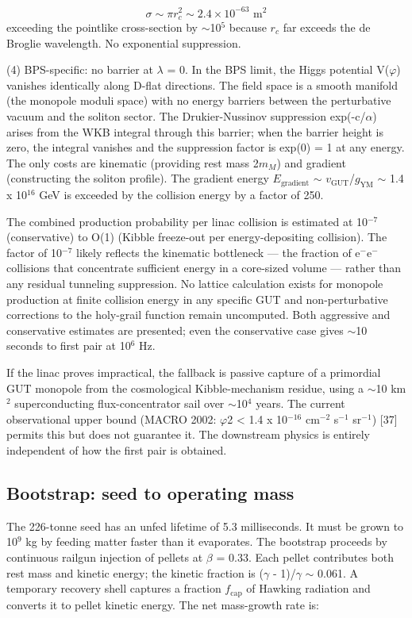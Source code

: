 \documentclass[12pt,a4paper]{article}
\begin{document}
\begin{equation}
\sigma \sim \pi r_c^2 \sim 2.4 \times 10^{-63} \text{ m}^2
\end{equation}
exceeding the pointlike cross-section by $\sim$10$^{5}$ because $r_c$ far exceeds the de Broglie wavelength. No exponential suppression.

(4) BPS-specific: no barrier at $\lambda$ = 0. In the BPS limit, the Higgs potential V($\varphi$) vanishes identically along D-flat directions. The field space is a smooth manifold (the monopole moduli space) with no energy barriers between the perturbative vacuum and the soliton sector. The Drukier-Nussinov suppression exp(-c/$\alpha$) arises from the WKB integral through this barrier; when the barrier height is zero, the integral vanishes and the suppression factor is exp(0) = 1 at any energy. The only costs are kinematic (providing rest mass 2$m_M$) and gradient (constructing the soliton profile). The gradient energy $E_{\text{gradient}}$ $\sim$ $v_{\text{GUT}}$/$g_{\text{YM}}$ $\sim$ 1.4 x 10$^{16}$ GeV is exceeded by the collision energy by a factor of 250.

The combined production probability per linac collision is estimated at 10$^{-7}$ (conservative) to O(1) (Kibble freeze-out per energy-depositing collision). The factor of 10$^{-7}$ likely reflects the kinematic bottleneck --- the fraction of e$^{-}$e$^{-}$ collisions that concentrate sufficient energy in a core-sized volume --- rather than any residual tunneling suppression. No lattice calculation exists for monopole production at finite collision energy in any specific GUT and non-perturbative corrections to the holy-grail function remain uncomputed. Both aggressive and conservative estimates are presented; even the conservative case gives $\sim$10 seconds to first pair at 10$^{6}$ Hz.

If the linac proves impractical, the fallback is passive capture of a primordial GUT monopole from the cosmological Kibble-mechanism residue, using a $\sim$10 km$^{2}$ superconducting flux-concentrator sail over $\sim$10$^{4}$ years. The current observational upper bound (MACRO 2002: $\varphi$2 < 1.4 x 10$^{-16}$ cm$^{-2}$ s$^{-1}$ sr$^{-1}$) [37] permits this but does not guarantee it. The downstream physics is entirely independent of how the first pair is obtained.

\subsection{Bootstrap: seed to operating mass}
The 226-tonne seed has an unfed lifetime of 5.3 milliseconds. It must be grown to 10$^{9}$ kg by feeding matter faster than it evaporates. The bootstrap proceeds by continuous railgun injection of pellets at $\beta$ = 0.33. Each pellet contributes both rest mass and kinetic energy; the kinetic fraction is ($\gamma$ - 1)/$\gamma$ $\sim$ 0.061. A temporary recovery shell captures a fraction $f_{\text{cap}}$ of Hawking radiation and converts it to pellet kinetic energy. The net mass-growth rate is:
\end{document}
